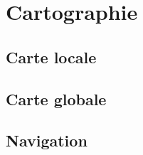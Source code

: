 \section{Cartographie}
\subsection{Carte locale}

\subsection{Carte globale}

\subsection{Navigation}